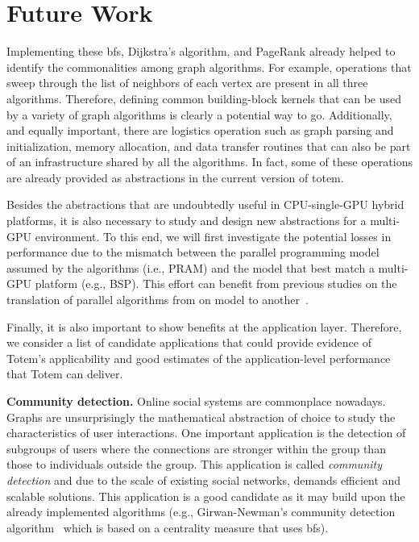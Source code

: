 \section{Future Work}
\label{sec:future}

Implementing these {\sc bfs}, Dijkstra's algorithm, and PageRank already helped to identify the commonalities among graph algorithms. For example, operations that sweep through the list of neighbors of each vertex are present in all three algorithms. Therefore, defining common building-block kernels that can be used by a variety of graph algorithms is clearly a potential way to go. Additionally, and equally important, there are logistics operation such as graph parsing and initialization, memory allocation, and data transfer routines that can also be part of an infrastructure shared by all the algorithms. In fact, some of these operations are already provided as abstractions in the current version of {\sc totem}.

Besides the abstractions that are undoubtedly useful in CPU-single-GPU hybrid platforms, it is also necessary to study and design new abstractions for a multi-GPU environment. To this end, we will first investigate the potential losses in performance due to the mismatch between the parallel programming model assumed by the algorithms (i.e., PRAM) and the model that best match a multi-GPU platform (e.g., BSP). This effort can benefit from previous studies on the translation of parallel algorithms from on model to another~\cite{Gerbessiotis92}. 

Finally, it is also important to show benefits at the application layer. Therefore, we consider a list of candidate applications that could provide evidence of {\sc Totem}'s applicability and good estimates of the application-level performance that {\sc Totem} can deliver. 

{\bf Community detection.} Online social systems are commonplace nowadays. Graphs are unsurprisingly the mathematical abstraction of choice to study the characteristics of user interactions. One important application is the detection of subgroups of users where the connections are stronger within the group than those to individuals outside the group. This application is called {\em community detection} and due to the scale of existing social networks, demands efficient and scalable solutions. This application is a good candidate as it may build upon the already implemented algorithms (e.g., Girwan-Newman's community detection algorithm~\cite{Newman2004} which is based on a centrality measure that uses {\sc bfs}).

